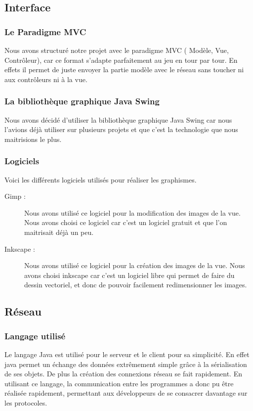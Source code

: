 \documentclass[a4paper,11pt]{report}
\begin{document}
    \subsection{Interface}
    \subsubsection{Le Paradigme MVC}
    Nous avons structuré notre projet avec le paradigme MVC ( Modèle, Vue, Contrôleur), car ce format s'adapte parfaitement au jeu en tour par tour. En effets il permet de juste envoyer la partie modèle avec le réseau sans toucher ni aux contrôleurs ni à la vue.   
    \subsubsection{La bibliothèque graphique Java Swing}
    Nous avons décidé d'utiliser la bibliothèque graphique Java Swing car nous l'avions déjà utiliser sur plusieurs projets et que c'est la technologie que nous maitrisions le plus.
    \subsubsection{Logiciels}
    Voici les différents logiciels utilisés pour réaliser les graphismes.

    \begin{description}
      \item[Gimp :] Nous avons utilisé ce logiciel pour la modification des images de la vue. Nous avons choisi ce logiciel car c'est un logiciel gratuit et que l'on maitrisait déjà un peu. 
      \item[Inkscape :] Nous avons utilisé ce logiciel pour la création des images de la vue. Nous avons choisi inkscape car c'est un logiciel libre qui permet de faire du dessin vectoriel, et donc de pouvoir facilement redimensionner les images. 
    \end{description}



\subsection{Réseau}

\subsubsection{Langage utilisé}
Le langage Java est utilisé pour le serveur et le client pour sa simplicité. En effet java permet un échange des données extrêmement simple grâce à la sérialisation de ses objets. De plus la création des connexions réseau se fait rapidement.
En utilisant ce langage, la communication entre les programmes a donc pu être réalisée rapidement, permettant aux développeurs de se consacrer davantage sur les protocoles.
\end{document}
